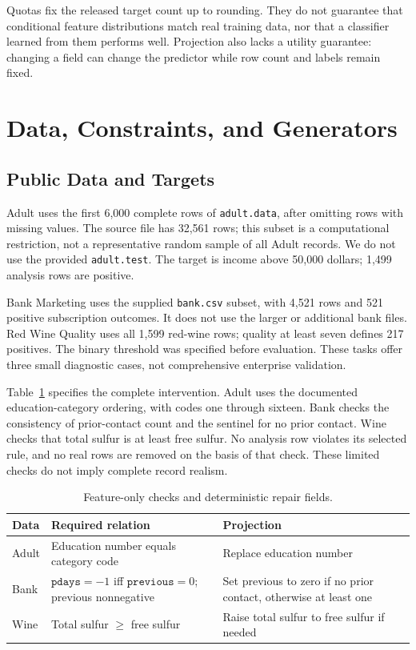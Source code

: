 \documentclass{svproc}
\begin{document}
Quotas fix the released target count up to rounding. They do not guarantee that conditional feature distributions match real training data, nor that a classifier learned from them performs well. Projection also lacks a utility guarantee: changing a field can change the predictor while row count and labels remain fixed.

\section{Data, Constraints, and Generators}
\subsection{Public Data and Targets}
Adult \cite{adult} uses the first 6,000 complete rows of \texttt{adult.data}, after omitting rows with missing values. The source file has 32,561 rows; this subset is a computational restriction, not a representative random sample of all Adult records. We do not use the provided \texttt{adult.test}. The target is income above 50,000 dollars; 1,499 analysis rows are positive.

Bank Marketing \cite{bank} uses the supplied \texttt{bank.csv} subset, with 4,521 rows and 521 positive subscription outcomes. It does not use the larger or additional bank files. Red Wine Quality \cite{wine} uses all 1,599 red-wine rows; quality at least seven defines 217 positives. The binary threshold was specified before evaluation. These tasks offer three small diagnostic cases, not comprehensive enterprise validation.

Table~\ref{tab:rules} specifies the complete intervention. Adult uses the documented education-category ordering, with codes one through sixteen. Bank checks the consistency of prior-contact count and the sentinel for no prior contact. Wine checks that total sulfur is at least free sulfur. No analysis row violates its selected rule, and no real rows are removed on the basis of that check. These limited checks do not imply complete record realism.

\begin{table}[!htbp]
\caption{Feature-only checks and deterministic repair fields.}\label{tab:rules}
\centering\small
\begin{tabular}{p{}p{}p{}}\toprule
Data & Required relation & Projection \\\midrule
Adult & Education number equals category code & Replace education number \\
Bank & $\texttt{pdays}=-1$ iff $\texttt{previous}=0$; previous nonnegative & Set previous to zero if no prior contact, otherwise at least one \\
Wine & Total sulfur $\geq$ free sulfur & Raise total sulfur to free sulfur if needed \\\bottomrule
\end{tabular}
\end{table}
\FloatBarrier
\end{document}
